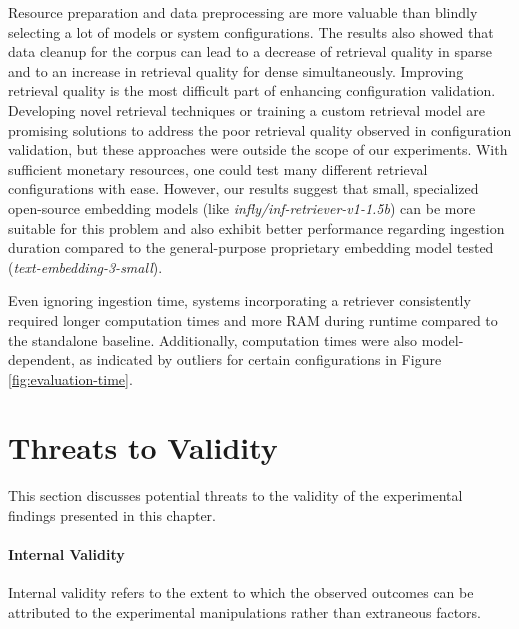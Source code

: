 Resource preparation and data preprocessing are more valuable than blindly selecting a lot of models or system configurations. The results also showed that data cleanup for the corpus can lead to a decrease of retrieval quality in sparse and to an increase in retrieval quality for dense simultaneously. Improving retrieval quality is the most difficult part of enhancing configuration validation. Developing novel retrieval techniques or training a custom retrieval model are promising solutions to address the poor retrieval quality observed in configuration validation, but these approaches were outside the scope of our experiments. With sufficient monetary resources, one could test many different retrieval configurations with ease. However, our results suggest that small, specialized open-source embedding models (like \textit{infly/inf-retriever-v1-1.5b}) can be more suitable for this problem and also exhibit better performance regarding ingestion duration compared to the general-purpose proprietary embedding model tested (\textit{text-embedding-3-small}).

Even ignoring ingestion time, systems incorporating a retriever consistently required longer computation times and more RAM during runtime compared to the standalone baseline. Additionally, computation times were also model-dependent, as indicated by outliers for certain configurations in Figure \ref{fig:evaluation-time}.

\section{Threats to Validity} \label{sec:exp_threats}

This section discusses potential threats to the validity of the experimental findings presented in this chapter.

\paragraph{Internal Validity}
Internal validity refers to the extent to which the observed outcomes can be attributed to the experimental manipulations rather than extraneous factors.


